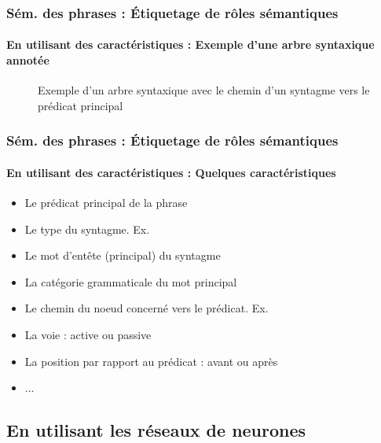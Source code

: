 \documentclass[xcolor=table]{beamer}
\begin{document}
\begin{frame}
	\frametitle{Sém. des phrases : Étiquetage de rôles sémantiques}
	\framesubtitle{En utilisant des caractéristiques : Exemple d'une arbre syntaxique annotée}
	
	\vspace{-0.2cm}
	\begin{figure}
		\caption{Exemple d'un arbre syntaxique avec le chemin d'un syntagme vers le prédicat principal \cite{2019-jurafsky-martin}}
	\end{figure}
	
\end{frame}

\begin{frame}
	\frametitle{Sém. des phrases : Étiquetage de rôles sémantiques}
	\framesubtitle{En utilisant des caractéristiques : Quelques caractéristiques}
	
	\begin{itemize}
		\item Le prédicat principal de la phrase
		\item Le type du syntagme. Ex. 
		\item Le mot d'entête (principal) du syntagme
		\item La catégorie grammaticale du mot principal 
		\item Le chemin du noeud concerné vers le prédicat. Ex. 
		\item La voie : active ou passive
		\item La position par rapport au prédicat : avant ou après
		\item ...
	\end{itemize}
	
\end{frame}

\subsection{En utilisant les réseaux de neurones}
\end{document}
